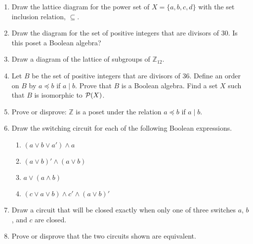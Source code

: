  
{\small
\begin{enumerate}
 
 
\item
Draw the lattice diagram for the power set of $X = \{ a, b, c, d \}$
with the set inclusion relation, $\subseteq$. 
 
 
\item
Draw the diagram for the set of positive integers that are divisors
of 30. Is this poset a Boolean algebra?
 
 
\item 
Draw a diagram of the lattice of subgroups of ${\mathbb Z}_{12}$.
 
 
\item
Let $B$ be the set of positive integers that are divisors of 36. Define
an order on $B$ by $a \preceq b$ if $a \mid b$.  Prove that $B$ is a
Boolean algebra. Find a set $X$ such that $B$ is isomorphic to ${\cal
P}(X)$.
 
 
\item
Prove or disprove: ${\mathbb Z}$ is a poset under the relation $a \preceq
b$ if $a \mid b$. 


\item
Draw the switching circuit for each of the following Boolean
expressions.
\begin{multicols}{2}
\begin{enumerate}

\item
$(a \vee b \vee a') \wedge a$

\item
$(a \vee b)' \wedge (a \vee b)$

\item
$a \vee (a \wedge b)$

\item
$(c \vee a \vee b) \wedge c' \wedge (a \vee b)'$

\end{enumerate}
\end{multicols}
  
 
\item
Draw a circuit that will be closed exactly when only one of three
switches $a$, $b$, and $c$ are closed.
 
 
\item
Prove or disprove that the two circuits shown are equivalent.

\begin{center}
\begin{tikzpicture}[scale=0.7,node distance=5mm, text height=1.5ex,text depth=.25ex] %



\end{tikzpicture}
\end{center}
\end{enumerate}}
